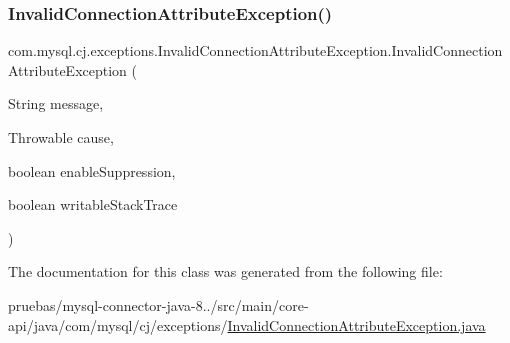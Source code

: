 \mbox{\label{classcom_1_1mysql_1_1cj_1_1exceptions_1_1_invalid_connection_attribute_exception_aa17841838d6c42e697caf8b856a2b18e}} 
\subsubsection{\texorpdfstring{Invalid\+Connection\+Attribute\+Exception()}{InvalidConnectionAttributeException()}\hspace{0.1cm}{\footnotesize\ttfamily [5/5]}}
{\footnotesize\ttfamily com.\+mysql.\+cj.\+exceptions.\+Invalid\+Connection\+Attribute\+Exception.\+Invalid\+Connection\+Attribute\+Exception (\begin{DoxyParamCaption}\item[{String}]{message,  }\item[{Throwable}]{cause,  }\item[{boolean}]{enable\+Suppression,  }\item[{boolean}]{writable\+Stack\+Trace }\end{DoxyParamCaption})}



The documentation for this class was generated from the following file\+:\begin{DoxyCompactItemize}
\item 
pruebas/mysql-\/connector-\/java-\/8../src/main/core-\/api/java/com/mysql/cj/exceptions/\mbox{\hyperlink{_invalid_connection_attribute_exception_8java}{Invalid\+Connection\+Attribute\+Exception.\+java}}\end{DoxyCompactItemize}
